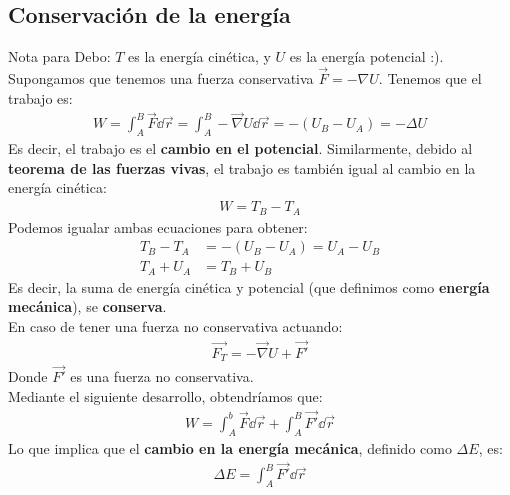 \documentclass{article}
\begin{document}
\subsection{Conservación de la energía}
Nota para Debo: $T$ es la energía cinética, y $U$ es la energía potencial :).\\
Supongamos que tenemos una fuerza conservativa $\vec{F}= -\nabla U$. Tenemos que el trabajo
es:
\begin{equation}
    \begin{split}
        W = \int_{A}^B \vec{F} \dd{\vec{r}} = \int _{A}^B - \vec{\nabla} U \dd{\vec{r}} = -(U_{B}-U_{A})
        = - \Delta U
    \end{split}
\end{equation}
Es decir, el trabajo es el \textbf{cambio en el potencial}.
Similarmente, debido al \textbf{teorema de las fuerzas vivas}, el trabajo es también
igual al cambio en la energía cinética:
\begin{equation}
    \begin{split}
        W = T_{B}-T_{A}
    \end{split}
\end{equation}
Podemos igualar ambas ecuaciones para obtener:
\begin{equation}
    \begin{split}
        T_{B}-T_{A} &= -(U_{B}-U_{A})= U_{A}-U_{B}\\
        T_{A} + U_{A} &= T_{B} + U_{B}
    \end{split}
\end{equation}
Es decir, la suma de energía cinética y potencial (que definimos como \textbf{energía mecánica}),
se \textbf{conserva}.\\
En caso de tener una fuerza no conservativa actuando:
\begin{equation}
    \begin{split}
        \vec{F_{T}}= - \vec{\nabla } U + \vec{F'}
    \end{split}
\end{equation}
Donde $\vec{F'}$ es una fuerza no conservativa.\\
Mediante el siguiente desarrollo, obtendríamos que:
\begin{equation}
    \begin{split}
        W = \int_{A}^b \vec{F} \dd{\vec{r}} + \int_{A}^B \vec{F'} \dd{\vec{r}}
    \end{split}
\end{equation}
Lo que implica que el \textbf{cambio en la energía mecánica}, definido como $\Delta E$, es:
\begin{equation}
    \begin{split}
        \Delta E = \int_{A}^B \vec{F'} \dd{\vec{r}}
    \end{split}
\end{equation}
\end{document}
